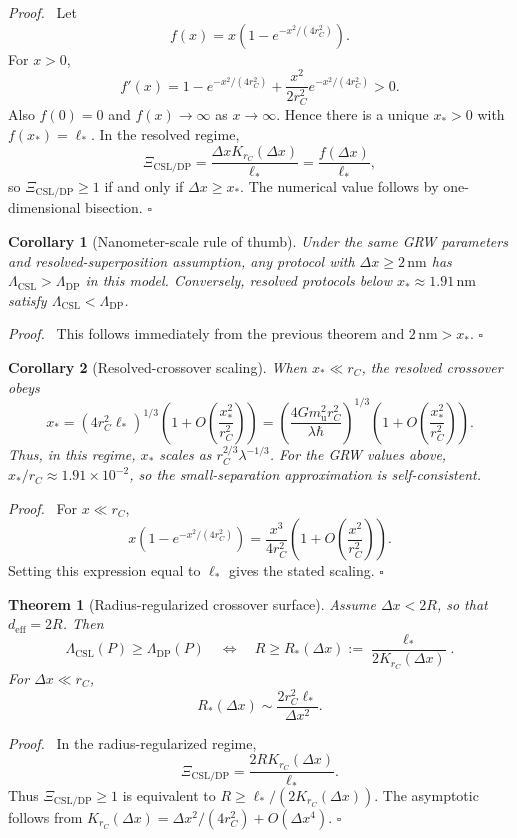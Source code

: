 \documentclass[
  aps,
  prd,
  preprint,
  notitlepage,
  superscriptaddress,
  nofootinbib,
  longbibliography
]{revtex4-2}
\newtheorem{theorem}{Theorem}
\newtheorem{corollary}{Corollary}
\newenvironment{proof}{\par\noindent\textit{Proof.}\ }{\hfill$\square$\par}
\newcommand{\amu}{m_{\mathrm u}}
\newcommand{\dx}{\Delta x}
\newcommand{\Lcsl}{\Lambda_{\mathrm{CSL}}}
\newcommand{\Ldp}{\Lambda_{\mathrm{DP}}}
\newcommand{\Krc}{K_{r_C}}
\newcommand{\Xic}{\Xi_{\mathrm{CSL/DP}}}
\newcommand{\ellstar}{\ell_*}
\begin{document}
\begin{proof}
Let
\[
f(x)=x\left(1-e^{-x^2/(4r_C^2)}\right).
\]
For $x>0$,
\[
f'(x)=1-e^{-x^2/(4r_C^2)}+\frac{x^2}{2r_C^2}e^{-x^2/(4r_C^2)}>0.
\]
Also $f(0)=0$ and $f(x)\to\infty$ as $x\to\infty$. Hence there is a unique $x_*>0$ with $f(x_*)=\ellstar$. In the resolved regime,
\[
\Xic=\frac{\dx\Krc(\dx)}{\ellstar}=\frac{f(\dx)}{\ellstar},
\]
so $\Xic\ge1$ if and only if $\dx\ge x_*$. The numerical value follows by one-dimensional bisection.
\end{proof}

\begin{corollary}[Nanometer-scale rule of thumb]
Under the same GRW parameters and resolved-superposition assumption, any protocol with $\dx\ge2\,\mathrm{nm}$ has $\Lcsl>\Ldp$ in this model. Conversely, resolved protocols below $x_*\approx1.91\,\mathrm{nm}$ satisfy $\Lcsl<\Ldp$.
\end{corollary}

\begin{proof}
This follows immediately from the previous theorem and $2\,\mathrm{nm}>x_*$.
\end{proof}

\begin{corollary}[Resolved-crossover scaling]
When $x_*\ll r_C$, the resolved crossover obeys
\[
x_*=(4r_C^2\ellstar)^{1/3}
\left(1+O\!\left(\frac{x_*^2}{r_C^2}\right)\right)
=\left(\frac{4G\amu^2r_C^2}{\lambda\hbar}\right)^{1/3}
\left(1+O\!\left(\frac{x_*^2}{r_C^2}\right)\right).
\]
Thus, in this regime, $x_*$ scales as $r_C^{2/3}\lambda^{-1/3}$. For the GRW values above, $x_*/r_C\approx1.91\times10^{-2}$, so the small-separation approximation is self-consistent.
\end{corollary}

\begin{proof}
For $x\ll r_C$,
\[
x\left(1-e^{-x^2/(4r_C^2)}\right)
=\frac{x^3}{4r_C^2}\left(1+O\!\left(\frac{x^2}{r_C^2}\right)\right).
\]
Setting this expression equal to $\ellstar$ gives the stated scaling.
\end{proof}

\begin{theorem}[Radius-regularized crossover surface]
Assume $\dx<2R$, so that $d_{\mathrm{eff}}=2R$. Then
\[
\Lcsl(P)\ge\Ldp(P)
\quad\Longleftrightarrow\quad
R\ge R_*(\dx):=\frac{\ellstar}{2\Krc(\dx)}.
\]
For $\dx\ll r_C$,
\[
R_*(\dx)\sim\frac{2r_C^2\ellstar}{\dx^2}.
\]
\end{theorem}

\begin{proof}
In the radius-regularized regime,
\[
\Xic=\frac{2R\Krc(\dx)}{\ellstar}.
\]
Thus $\Xic\ge1$ is equivalent to $R\ge\ellstar/(2\Krc(\dx))$. The asymptotic follows from $\Krc(\dx)=\dx^2/(4r_C^2)+O(\dx^4)$.
\end{proof}
\end{document}
